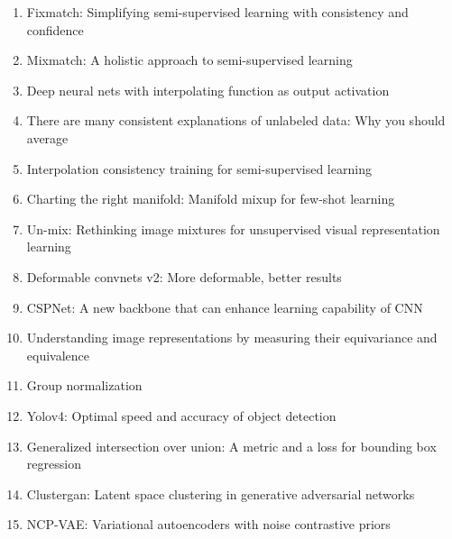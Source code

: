 \documentclass[acmlarge]{acmart}
\begin{document}
\begin{enumerate}
	\item Fixmatch: Simplifying semi-supervised learning with consistency and confidence \cite{sohn2020fixmatch} 

	\item Mixmatch: A holistic approach to semi-supervised learning \cite{berthelot2019mixmatch} 

	\item Deep neural nets with interpolating function as output activation \cite{wang2018deep} 

	\item There are many consistent explanations of unlabeled data: Why you should average \cite{athiwaratkun2018there} 

	\item Interpolation consistency training for semi-supervised learning \cite{verma2019interpolation} 

	\item Charting the right manifold: Manifold mixup for few-shot learning \cite{mangla2020charting} 

	\item Un-mix: Rethinking image mixtures for unsupervised visual representation learning \cite{shen2020mix} 

	\item Deformable convnets v2: More deformable, better results \cite{zhu2019deformable} 

	\item CSPNet: A new backbone that can enhance learning capability of CNN \cite{wang2020cspnet} 

	\item Understanding image representations by measuring their equivariance and equivalence \cite{lenc2015understanding} 

	\item Group normalization \cite{wu2018group} 

	\item Yolov4: Optimal speed and accuracy of object detection \cite{bochkovskiy2020yolov4} 

	\item Generalized intersection over union: A metric and a loss for bounding box regression \cite{rezatofighi2019generalized} 

	\item Clustergan: Latent space clustering in generative adversarial networks \cite{mukherjee2019clustergan} 

	\item NCP-VAE: Variational autoencoders with noise contrastive priors \cite{aneja2020ncp} 


\end{enumerate}
\end{document}
